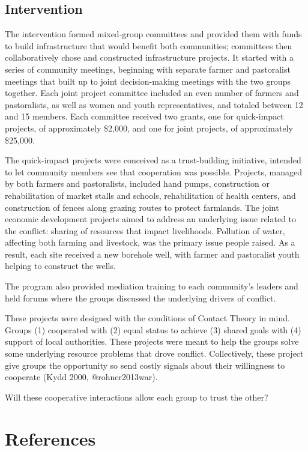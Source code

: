 \documentclass[11pt]{article}
\begin{document}
\hypertarget{intervention}{%
\subsection{Intervention}\label{intervention}}

The intervention formed mixed-group committees and provided them with
funds to build infrastructure that would benefit both communities;
committees then collaboratively chose and constructed infrastructure
projects. It started with a series of community meetings, beginning with
separate farmer and pastoralist meetings that built up to joint
decision-making meetings with the two groups together. Each joint
project committee included an even number of farmers and pastoralists,
as well as women and youth representatives, and totaled between 12 and
15 members. Each committee received two grants, one for quick-impact
projects, of approximately \$2,000, and one for joint projects, of
approximately \$25,000.

The quick-impact projects were conceived as a trust-building initiative,
intended to let community members see that cooperation was possible.
Projects, managed by both farmers and pastoralists, included hand pumps,
construction or rehabilitation of market stalls and schools,
rehabilitation of health centers, and construction of fences along
grazing routes to protect farmlands. The joint economic development
projects aimed to address an underlying issue related to the conflict:
sharing of resources that impact livelihoods. Pollution of water,
affecting both farming and livestock, was the primary issue people
raised. As a result, each site received a new borehole well, with farmer
and pastoralist youth helping to construct the wells.

The program also provided mediation training to each community's leaders
and held forums where the groups discussed the underlying drivers of
conflict.

These projects were designed with the conditions of Contact Theory in
mind. Groups (1) cooperated with (2) equal status to achieve (3) shared
goals with (4) support of local authorities. These projects were meant
to help the groups solve some underlying resource problems that drove
conflict. Collectively, these project give groups the opportunity so
send costly signals about their willingness to cooperate (Kydd 2000,
@rohner2013war).

Will these cooperative interactions allow each group to trust the other?

\hypertarget{references}{%
\section*{References}\label{references}}
\end{document}
